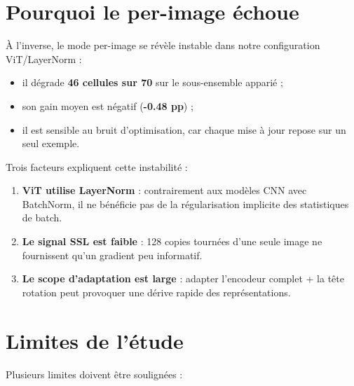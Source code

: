 \documentclass[12pt,a4paper]{report}
\begin{document}
	\section{Pourquoi le per-image échoue}
	À l’inverse, le mode per-image se révèle instable dans notre configuration ViT/LayerNorm :
	\begin{itemize}
		\item il dégrade \textbf{46 cellules sur 70} sur le sous-ensemble apparié ;
		\item son gain moyen est négatif (\textbf{-0.48 pp}) ;
		\item il est sensible au bruit d’optimisation, car chaque mise à jour repose sur un seul exemple.
	\end{itemize}
	
	Trois facteurs expliquent cette instabilité :
	\begin{enumerate}
		\item \textbf{ViT utilise LayerNorm} : contrairement aux modèles CNN avec BatchNorm, il ne bénéficie pas de la régularisation implicite des statistiques de batch.
		\item \textbf{Le signal SSL est faible} : 128 copies tournées d’une seule image ne fournissent qu’un gradient peu informatif.
		\item \textbf{Le scope d’adaptation est large} : adapter l’encodeur complet + la tête rotation peut provoquer une dérive rapide des représentations.
	\end{enumerate}
	
	\section{Limites de l’étude}
	Plusieurs limites doivent être soulignées :
	
\end{document}
